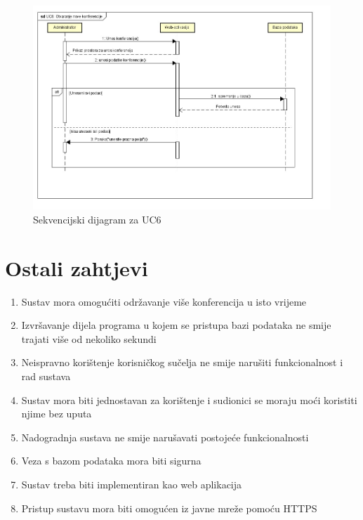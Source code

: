 		\begin{figure}[H]
			\includegraphics[scale=0.7]{slike/sek_dod_konf.jpg} 
			\centering
			\caption{Sekvencijski dijagram za UC6}
			\label{fig:UC5}
		\end{figure}		
		
		\section{Ostali zahtjevi}
		
		
		
		\begin{enumerate}
			\item Sustav mora omogućiti održavanje više konferencija u isto vrijeme
			\item Izvršavanje dijela programa u kojem se pristupa bazi podataka ne smije trajati više od nekoliko sekundi
			\item Neispravno korištenje korisničkog sučelja ne smije narušiti funkcionalnost i rad sustava
			\item Sustav mora biti jednostavan za korištenje i sudionici se moraju moći koristiti njime bez uputa
			\item Nadogradnja sustava ne smije narušavati postojeće funkcionalnosti
			\item Veza s bazom podataka mora biti sigurna
			\item Sustav treba biti implementiran kao web aplikacija
			\item Pristup sustavu mora biti omogućen iz javne mreže pomoću HTTPS
		\end{enumerate}
			 
			 
	
